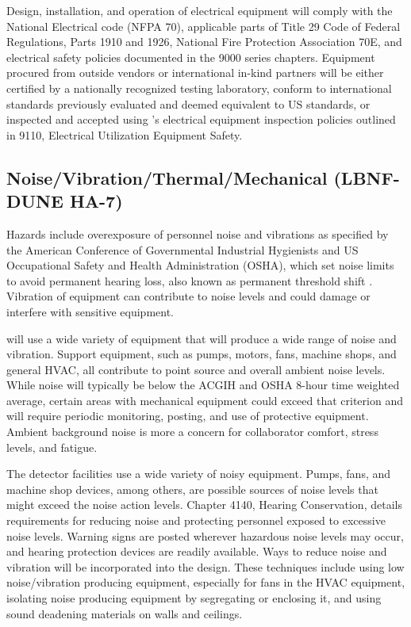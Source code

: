 Design, installation, and operation of electrical equipment will
comply with the National Electrical code (NFPA 70), applicable parts
of Title 29 Code of Federal Regulations, Parts 1910 and 1926, National
Fire Protection Association 70E, and \fnal electrical safety policies
documented in the  9000 series chapters. Equipment
procured from outside vendors or international in-kind partners will
be either certified by a nationally recognized testing laboratory,
conform to international standards previously evaluated and deemed
equivalent to US standards, or inspected and accepted using \fnal's
electrical equipment inspection policies outlined in 
9110, Electrical Utilization Equipment Safety.


\subsection{Noise/Vibration/Thermal/Mechanical (LBNF-DUNE HA-7)}

Hazards include overexposure of personnel noise and vibrations as
specified by the American Conference of Governmental Industrial
Hygienists and US Occupational Safety and Health Administration
(OSHA), which set noise limits to avoid permanent hearing loss, also
known as permanent threshold shift . Vibration of equipment can
contribute to noise levels and could damage or interfere with
sensitive equipment.

 will use a wide variety of equipment that
will produce a wide range of noise and vibration. Support equipment,
such as pumps, motors, fans, machine shops, and general HVAC, all
contribute to point source and overall ambient noise levels. While
noise will typically be below the ACGIH and OSHA 8-hour time weighted
average, certain areas with mechanical equipment could exceed that
criterion and will require periodic monitoring, posting, and use of
protective equipment. Ambient background noise is more a concern for
collaborator comfort, stress levels, and fatigue.

The detector facilities use a wide variety of noisy equipment. Pumps,
fans, and machine shop devices, among others, are possible sources of
noise levels that might exceed the \fnal noise action
levels.  Chapter 4140, Hearing Conservation, details
requirements for reducing noise and protecting personnel exposed to
excessive noise levels. Warning signs are posted wherever hazardous
noise levels may occur, and hearing protection devices are readily
available. Ways to reduce noise and vibration will be incorporated
into the  design. These techniques include
using low noise/vibration producing equipment, especially for fans in
the HVAC equipment, isolating noise producing equipment by segregating
or enclosing it, and using sound deadening materials on walls and
ceilings.

